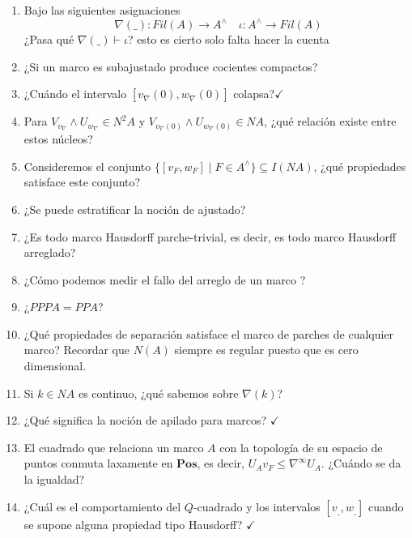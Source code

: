 \documentclass[11pt]{amsart}
\theoremstyle{plain}
\theoremstyle{definition}
\begin{document}
\begin{enumerate}
    \item Bajo las siguientes asignaciones 
    \[
    \nabla(\_ )\colon Fil(A)\to A^\wedge\quad \iota\colon A^\wedge \to Fil(A)
    \]
    ¿Pasa qué $\nabla(\_ ) \vdash \iota$? esto es cierto solo falta hacer la cuenta
    
    \item ¿Si un marco es subajustado produce cocientes compactos?
    \item ¿Cuándo el intervalo $[v_\nabla (0), w_\nabla(0)]$ colapsa?$\checkmark$

    \item Para $V_{v_\nabla}\wedge U_{w_\nabla}\in N^2A$ y $V_{v_\nabla(0)}\wedge U_{w_\nabla(0)}\in NA$, ¿qué relación existe entre estos núcleos?

    \item Consideremos el conjunto $\{[v_F, w_F]\mid F\in A^\wedge\}\subseteq I(NA)$, ¿qué propiedades satisface este conjunto?

    \item ¿Se puede estratificar la noción de ajustado?

  \item ¿Es todo marco Hausdorff parche-trivial, es decir, es todo marco Hausdorff arreglado?
  
  \item ¿Cómo podemos medir el fallo del arreglo de un marco ?

  \item ¿$PPPA=PPA$?
  
\item ¿Qué propiedades de separación satisface el marco de parches de cualquier marco? Recordar que $N(A)$ siempre es regular puesto que es cero dimensional.

\item Si $k\in NA$ es continuo, ¿qué sabemos sobre $\nabla(k)$?

\item ¿Qué significa la noción de apilado para marcos? $\checkmark$

\item El cuadrado que relaciona un marco $A$ con la topología de su espacio de puntos conmuta laxamente en $\mathbf{Pos}$, es decir, $U_Av_F\leq \nabla^\infty U_A$. ¿Cuándo se da la igualdad? 

\item ¿Cuál es el comportamiento del $Q$-cuadrado y los intervalos $[v_\_, w_\_]$ cuando se supone alguna propiedad tipo Hausdorff? $\checkmark$


\end{enumerate}
\end{document}
